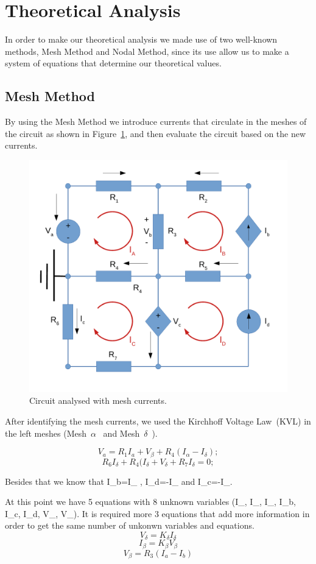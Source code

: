 \section{Theoretical Analysis}
\label{sec:analysis}

In order to make our theoretical analysis we made use of two well-known methods, Mesh Method and  Nodal Method, since its use allow us to make a system of equations that determine our theoretical values.

\subsection{Mesh Method}

By using the Mesh Method we introduce currents that circulate in the meshes of the circuit as shown in Figure~\ref{fig:Circuit_Mesh}, and then evaluate the circuit based on the new currents.

\begin{figure}[h] \centering
\includegraphics[width=0.5\linewidth]{CircuitMesh.pdf}
\caption{Circuit analysed with mesh currents.}
\label{fig:Circuit_Mesh}
\end{figure}

After identifying the mesh currents, we used the Kirchhoff Voltage Law~(KVL) in the left meshes (Mesh~$\alpha$~ and Mesh~$\delta$~).

\begin{equation}
 V_a= R_1I_a + V_{\beta} + R_4(I_{\alpha} - I_{\delta});
  \label{eq:MM_Alpha}
\end{equation}
\begin{equation}
  R_6I_{\delta} + R_4(I_{\delta} + V_{\delta} + R_7I_{\delta} = 0;
  \label{eq:MM_Delta}
\end{equation}

Besides that we know that I_b=I_{\beta} , I_d=-I_{\gamma} and I_c=-I_{\delta}.

At this point we have 5 equations with 8 unknown variables (I_{\alpha}, I_{\beta}, I_{\delta}, I_b, I_c, I_d, V_{\beta}, V_{\delta}).
It is required more 3 equations that add more information in order to get the same number of unkonwn variables and equations. 
\begin{equation}
 V_{\delta}=K_{\delta}I_{\delta}
  \label{eq:Vc}
\end{equation}
\begin{equation}
  I_{\beta}=K_{\beta}V_{\beta}
  \label{eq:Ib}
\end{equation}
\begin{equation}
V_{\beta}=R_3(I_a-I_b)
\end{equation}


